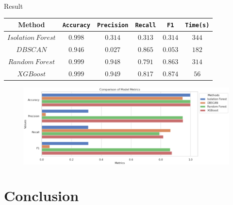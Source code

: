 \documentclass[
 size=14pt,
 paper=smartboard,  %
 mode=present, 		%
 display=slides, 	%
 style=tuliplab,  	%
 pauseslide,
 fleqn,leqno]{powerdot}
\begin{document}
\begin{slide}[toc=,bm=]{Result}
\begin{center}
	\begin{tabular}{c| c c c c c }
		\toprule
		Method & \texttt{Accuracy}  & \texttt{Precision} & \texttt{Recall}  & \texttt{F1}  & \texttt{Time(s)}\\
		\midrule
		$Isolation\ Forest$
		&  {$0.998$} &  {$0.314$} & {$0.313$} & {$0.314$}  & {$344$} \\
		$DBSCAN$
		&  {$0.946$} &  {$0.027$} & {$0.865$} & {$0.053$}  & {$182$} \\
		$Random\ Forest$
		&  {$0.999$} &  {$0.948$} & {$0.791$} & {$0.863$}  & {$314$} \\
		$XGBoost$
		&  {$0.999$} &  {$0.949$} & {$0.817$} & {$0.874$}  & {$56$} \\
		\bottomrule
	\end{tabular}
\end{center}
	\begin{figure}
		\centering
		\includegraphics[scale=0.515]{result.eps}
	\end{figure}
	
\end{slide}

\section{Conclusion}
\end{document}
